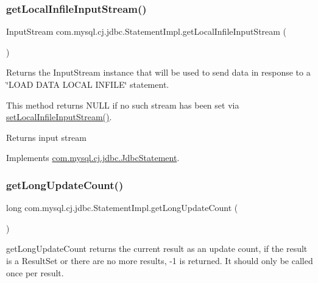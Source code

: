 \subsubsection{\texorpdfstring{get\+Local\+Infile\+Input\+Stream()}{getLocalInfileInputStream()}}
{\footnotesize\ttfamily Input\+Stream com.\+mysql.\+cj.\+jdbc.\+Statement\+Impl.\+get\+Local\+Infile\+Input\+Stream (\begin{DoxyParamCaption}{ }\end{DoxyParamCaption})}

Returns the Input\+Stream instance that will be used to send data in response to a \char`\"{}\+L\+O\+A\+D D\+A\+T\+A L\+O\+C\+A\+L I\+N\+F\+I\+L\+E\char`\"{} statement.

This method returns N\+U\+LL if no such stream has been set via \mbox{\hyperlink{classcom_1_1mysql_1_1cj_1_1jdbc_1_1_statement_impl_a398ed93fc7171fac680cd867a87cbf23}{set\+Local\+Infile\+Input\+Stream()}}.

\begin{DoxyReturn}{Returns}
input stream 
\end{DoxyReturn}


Implements \mbox{\hyperlink{interfacecom_1_1mysql_1_1cj_1_1jdbc_1_1_jdbc_statement_a1f5ddb4f3f7ad5c677a27d5350568eac}{com.\+mysql.\+cj.\+jdbc.\+Jdbc\+Statement}}.

\mbox{\label{classcom_1_1mysql_1_1cj_1_1jdbc_1_1_statement_impl_a05b7122d9eb36876362b1e526e9dfd38}} 
\subsubsection{\texorpdfstring{get\+Long\+Update\+Count()}{getLongUpdateCount()}}
{\footnotesize\ttfamily long com.\+mysql.\+cj.\+jdbc.\+Statement\+Impl.\+get\+Long\+Update\+Count (\begin{DoxyParamCaption}{ }\end{DoxyParamCaption})}

get\+Long\+Update\+Count returns the current result as an update count, if the result is a Result\+Set or there are no more results, -\/1 is returned. It should only be called once per result.

